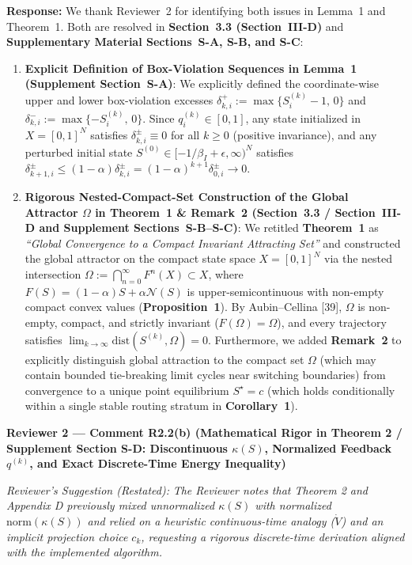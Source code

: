 \documentclass[11pt,a4paper]{article}
\newcommand{\cbox}[2]{%
  \vspace{0.6em}\noindent\textbf{#1}\par\smallskip
  \noindent\textit{Reviewer's Suggestion (Restated):} \textit{#2}\par\smallskip
}
\begin{document}
\noindent\textbf{Response:} We thank Reviewer~2 for identifying both issues in Lemma~1 and Theorem~1. Both are resolved in \textbf{Section~3.3 (Section~III-D)} and \textbf{Supplementary Material Sections~S-A, S-B, and S-C}:
\begin{enumerate}[leftmargin=1.8em]
    \item \textbf{Explicit Definition of Box-Violation Sequences in Lemma~1 (Supplement Section~S-A)}: We explicitly defined the coordinate-wise upper and lower box-violation excesses $\delta^+_{k,i} := \max\{S_i^{(k)}-1,\, 0\}$ and $\delta^-_{k,i} := \max\{-S_i^{(k)},\, 0\}$. Since $q_i^{(k)} \in [0,1]$, any state initialized in $X=[0,1]^N$ satisfies $\delta^\pm_{k,i} \equiv 0$ for all $k \ge 0$ (positive invariance), and any perturbed initial state $S^{(0)} \in [-1/\beta_I+\epsilon, \infty)^N$ satisfies $\delta^\pm_{k+1,i} \le (1-\alpha)\delta^\pm_{k,i} = (1-\alpha)^{k+1}\delta^\pm_{0,i} \to 0$.
    \item \textbf{Rigorous Nested-Compact-Set Construction of the Global Attractor $\Omega$ in Theorem~1 \& Remark~2 (Section~3.3 / Section~III-D and Supplement Sections~S-B--S-C)}: We retitled \textbf{Theorem~1} as \textit{``Global Convergence to a Compact Invariant Attracting Set''} and constructed the global attractor on the compact state space $X=[0,1]^N$ via the nested intersection $\Omega := \bigcap_{n=0}^{\infty} F^n(X) \subset X$, where $F(S) = (1-\alpha)S + \alpha\mathcal{N}(S)$ is upper-semicontinuous with non-empty compact convex values (\textbf{Proposition~1}). By Aubin--Cellina [39], $\Omega$ is non-empty, compact, and strictly invariant ($F(\Omega)=\Omega$), and every trajectory satisfies $\lim_{k\to\infty}\mathrm{dist}(S^{(k)}, \Omega)=0$. Furthermore, we added \textbf{Remark~2} to explicitly distinguish global attraction to the compact set $\Omega$ (which may contain bounded tie-breaking limit cycles near switching boundaries) from convergence to a unique point equilibrium $S^\star = c$ (which holds conditionally within a single stable routing stratum in \textbf{Corollary~1}).
\end{enumerate}

\hrulefill

\cbox{Reviewer 2 --- Comment R2.2(b) (Mathematical Rigor in Theorem 2 / Supplement Section S-D: Discontinuous $\kappa(S)$, Normalized Feedback $q^{(k)}$, and Exact Discrete-Time Energy Inequality)}{The Reviewer notes that Theorem 2 and Appendix D previously mixed unnormalized $\kappa(S)$ with normalized $\mathrm{norm}(\kappa(S))$ and relied on a heuristic continuous-time analogy ($\dot{V}$) and an implicit projection choice $c_k$, requesting a rigorous discrete-time derivation aligned with the implemented algorithm.}
\end{document}
